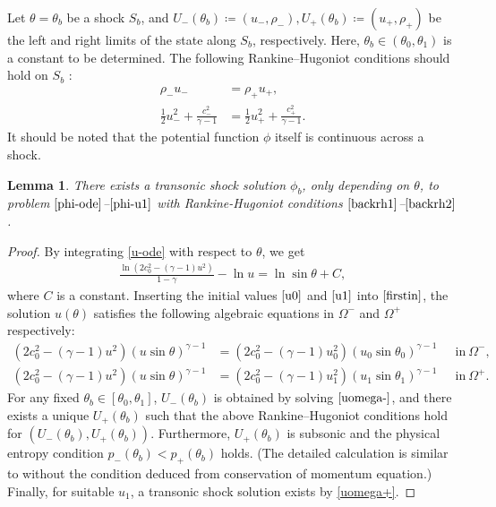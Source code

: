 \documentclass[10pt,a4paper]{amsart}
\newtheorem{lemma}{Lemma}[section]
\numberwithin{equation}{section}
\begin{document}
Let $\theta=\theta_b$ be a shock $S_b$, and $U_-(\theta_b)\coloneqq (u_-, \rho_-),U_+(\theta_b) \coloneqq (u_+, \rho_+)$ be the left and right limits of the state along $S_b$, respectively. Here, $\theta_b\in(\theta_0,\theta_1)$ is a constant to be determined. The following Rankine–Hugoniot conditions should hold on $S_b$ :
	\begin{align}
		\rho_-u_-&=\rho_+u_+,\label{backrh1}\\
		\frac{1}{2}u_-^2+\frac{c^2_-}{\gamma-1}&=\frac{1}{2}u_+^2+\frac{c^2_+}{\gamma-1}.\label{backrh2}
	\end{align}
It should be noted that the potential function $\phi$ itself is continuous across a shock. 
	\begin{lemma}\label{solvable}
		There exists a transonic shock solution $\phi_b$, only depending on $\theta$, to problem $\eqref{phi-ode}$--$\eqref{phi-u1}$ with Rankine-Hugoniot conditions $\eqref{backrh1}$--$\eqref{backrh2}$.
	\end{lemma}
\begin{proof}
By integrating \eqref{u-ode} with respect to $\theta$, we get
	\begin{align}\label{firstin}
		\frac{\ln(2c^2_0-(\gamma-1)u^2)}{1-\gamma}-\ln u=\ln \sin\theta +C,
	\end{align}
where $C$ is a constant. Inserting the initial values $\eqref{u0}$ and $\eqref{u1}$ into $\eqref{firstin}$, the solution $u(\theta)$ satisfies the following algebraic equations in $\Omega^-$ and $\Omega^+$ respectively:
	\begin{align}
	(2c^2_0-(\gamma-1)u^2)(u\sin\theta)^{\gamma-1}&=(2c^2_0-(\gamma-1)u^2_0)(u_0\sin\theta_0)^{\gamma-1}~~\quad \text{in}~\Omega^-,\label{uomega-}\\
		(2c^2_0-(\gamma-1)u^2)(u\sin\theta)^{\gamma-1}&=(2c^2_0-(\gamma-1)u^2_1)(u_1\sin\theta_1)^{\gamma-1}~~\quad \text{in}~\Omega^+.\label{uomega+}
	\end{align}
For any fixed $\theta_b\in [\theta_0,\theta_1]$, $U_-(\theta_b)$ is obtained by solving $\eqref{uomega-}$, and there exists a unique $U_+(\theta_b)$  such that the above Rankine–Hugoniot conditions hold for $(U_-(\theta_b), U_+(\theta_b))$. Furthermore, $U_+(\theta_b)$ is subsonic and the physical entropy condition $p_-(\theta_b) < p_+(\theta_b)$ holds. (The detailed calculation is similar to \cite[Proposition 3]{backremarkY} without the condition deduced from conservation of momentum equation.) Finally, for suitable $u_1$,  a transonic shock solution exists by \eqref{uomega+}.
\end{proof}
\end{document}
